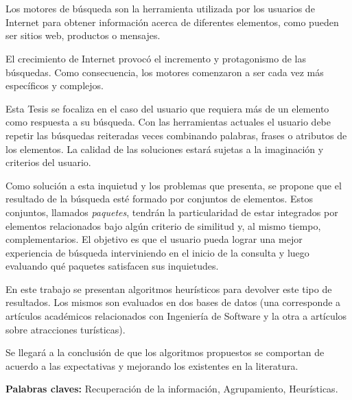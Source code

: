 \chapter*{\runtitulo}

\noindent 

Los motores de búsqueda son la herramienta utilizada por los usuarios de Internet para obtener información acerca de diferentes elementos, como pueden ser sitios web, productos o mensajes.

El crecimiento de Internet provocó el incremento y protagonismo de las búsquedas. Como consecuencia, los motores comenzaron a ser cada vez más específicos y complejos. 

Esta Tesis se focaliza en el caso del usuario que requiera más de un elemento como respuesta a su búsqueda. Con las herramientas actuales el usuario debe repetir las búsquedas reiteradas veces combinando palabras, frases o atributos de los elementos. La calidad de las soluciones estará sujetas a la imaginación y criterios del usuario.

Como solución a esta inquietud y los problemas que presenta, se propone que el resultado de la búsqueda esté formado por conjuntos de elementos. Estos conjuntos, llamados {\em paquetes}, tendrán la particularidad de estar integrados por elementos relacionados bajo algún criterio de similitud y, al mismo tiempo, complementarios. El objetivo es que el usuario pueda lograr una mejor experiencia de búsqueda interviniendo en el inicio de la consulta y luego evaluando qué paquetes satisfacen sus inquietudes.

En este trabajo se presentan algoritmos heurísticos para devolver este tipo de resultados. Los mismos son evaluados en dos bases de datos (una corresponde a artículos académicos relacionados con Ingeniería de Software y la otra a artículos sobre atracciones turísticas).

Se llegará a la conclusión de que los algoritmos propuestos se comportan de acuerdo a las expectativas y mejorando los existentes en la literatura.


\bigskip



\noindent\textbf{Palabras claves:} Recuperación de la información, Agrupamiento, Heurísticas.